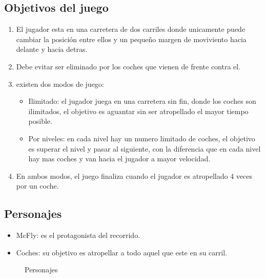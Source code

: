 \documentclass[11pt, spanish]{article}
\begin{document}
\subsection{Objetivos del juego}
\begin{enumerate}
	\item El jugador esta en una carretera de dos carriles donde unicamente puede cambiar la posición entre ellos y un pequeño margen de moviviento hacia delante y hacia detras.
	\item Debe evitar ser eliminado por los coches que vienen de frente contra el.
	\item existen dos modos de juego:
	\begin{itemize}
		\item Ilimitado: el jugador juega en una carretera sin fin, donde los coches son ilimitados, el objetivo es aguantar sin ser atropellado el mayor tiempo posible.
		\item Por niveles: en cada nivel hay un numero limitado de coches, el objetivo es superar el nivel y pasar al siguiente, con la diferencia que en cada nivel hay mas coches y van hacia el jugador a mayor velocidad.
	\end{itemize}
	\item En ambos modos, el juego finaliza cuando el jugador es atropellado 4 veces por un coche.
\end{enumerate}

\subsection{Personajes}
\begin{itemize}
	\item McFly: es el protagonista del recorrido.
	\item Coches: su objetivo es atropellar a todo aquel que este en su carril.
\end{itemize}

\begin{figure}[h!]
\centering
{}
\caption{Personajes}
\end{figure}
\end{document}

